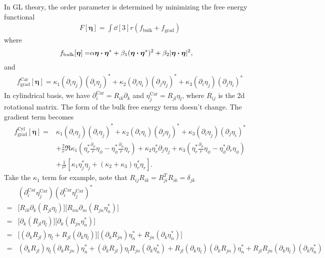 \documentclass[aps,prl,preprint]{revtex4-2}
\begin{document}
In GL theory, the order parameter is determined by minimizing the free energy functional
\begin{align}
    F[\bm{\eta}]=\int\dd[3]r\left(f_{\text{bulk}}+f_{\text{grad}}\right)
\end{align}
where
\begin{align}
    f_{\text{bulk}}[\bm{\eta}]=&\alpha\bm{\eta}\vdot\bm{\eta}^*
    +\beta_1(\bm{\eta}\vdot\bm{\eta}^*)^2
    +\beta_2|\bm{\eta}\vdot\bm{\eta}|^2,
\end{align}
and
\begin{align}
    f^{\text{Car}}_{\text{grad}}[\bm{\eta}]=\kappa_1(\partial_i\eta_j)(\partial_i\eta_j)^*
    +\kappa_2(\partial_i\eta_i)(\partial_j\eta_j)^*
    +\kappa_3(\partial_i\eta_j)(\partial_j\eta_i)^*
\end{align}
In cylindrical basis, we have $\partial_i^\text{Car}=R_{ik}\partial_k$
and $\eta_j^\text{Car}=R_{jl}\eta_l$, where $R_{ij}$ is the 2d rotational matrix.
The form of the bulk free energy term doesn't change.
The gradient term becomes
\begin{align}
    f^{\text{Cyl}}_{\text{grad}}[\bm{\eta}]=&\kappa_1(\partial_i\eta_j)(\partial_i\eta_j)^*
    +\kappa_2(\partial_i\eta_i)(\partial_j\eta_j)^*
    +\kappa_3(\partial_i\eta_j)(\partial_j\eta_i)^*\nonumber\\
    &+\frac{2}{r}\Re{
    \kappa_1\left(\eta_r^*\frac{\partial_\phi}{r}\eta_\phi
    -\eta_\phi^*\frac{\partial_\phi}{r}\eta_r\right)
    +\kappa_2\eta_r^*\partial_j\eta_j
    +\kappa_3\left(\eta_r^*\frac{\partial_\phi}{r}\eta_\phi
    -\eta_\phi^*\partial_r\eta_\phi\right)}\nonumber\\
    &+\frac{1}{r^2}\left[\kappa_1\eta^*_j\eta_j
    +(\kappa_2+\kappa_3)\eta_r^*\eta_r\right].
\end{align}
Take the $\kappa_1$ term for example, note that $R_{ij}R_{ik}=R^T_{ji}R_{ik}=\delta_{jk}$
\begin{align}
    &(\partial_i^{\text{Car}}\eta_j^{\text{Car}})(\partial_i^{\text{Car}}\eta_j^{\text{Car}})^*\\
    =&\bigg[R_{ik}\partial_k(R_{jl}\eta_l)\bigg]\bigg[R_{im}\partial_m(R_{jn}\eta_n^*)\bigg]\\
    =&\bigg[\partial_k(R_{jl}\eta_l)\bigg]\bigg[\partial_k(R_{jn}\eta_n^*)\bigg]\\
    =&\bigg[(\partial_kR_{jl})\eta_l + R_{jl}(\partial_k\eta_l)\bigg]
    \bigg[(\partial_k R_{jn})\eta_n^* + R_{jn}(\partial_k\eta_n^*)\bigg]\\
    =&(\partial_k R_{jl})\eta_l (\partial_k R_{jn})\eta_n^*
    +(\partial_k R_{jl})\eta_l R_{jn}(\partial_k\eta_n^*)
    +R_{jl}(\partial_k\eta_l) (\partial_k R_{jn})\eta_n^*
    +R_{jl}R_{jn}(\partial_k\eta_l)(\partial_k \eta_n^*)\nonumber
\end{align}
\end{document}

